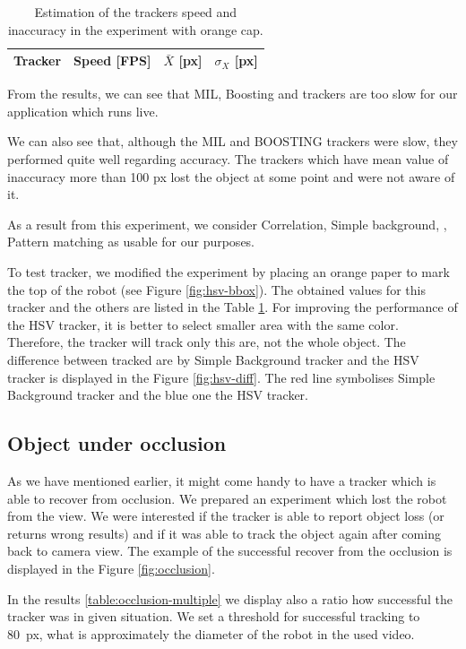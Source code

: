\begin{table}
\centering
\begin{tabular}{l|r|r|r}
Tracker	& Speed [FPS] & $\bar{X}$ [px] & $\sigma_X$ [px] \\
\hline

\end{tabular}
\caption{Estimation of the trackers speed and inaccuracy in the experiment with orange cap.}
\label{table:hsv}
\end{table}

From the results, we can see that MIL, Boosting and \tld{} trackers are too slow
for our application which runs live.

We can also see that, although the MIL and BOOSTING trackers were slow, they
performed quite well regarding accuracy. The trackers which have mean value of
inaccuracy more than 100 px lost the object at some point and were not aware of
it.

As a result from this experiment, we consider Correlation, Simple background,
\medflow{}, Pattern matching as usable for our purposes.

To test \hsv{} tracker, we modified the experiment by placing an orange paper to
mark the top of the robot (see Figure \ref{fig:hsv-bbox}). The obtained
values for this tracker and the others are listed in the Table \ref{table:hsv}.
For improving the performance of the HSV tracker, it is better to select
smaller area with the same color. Therefore, the tracker will track only this
are, not the whole object. The difference between tracked are by Simple
Background tracker and the HSV tracker is displayed in the Figure
\ref{fig:hsv-diff}. The red line symbolises Simple Background tracker and the
blue one the HSV tracker.

\subsection{Object under occlusion}

As we have mentioned earlier, it might come handy to have a tracker which is
able to recover from occlusion. We prepared an experiment which lost the
robot from the view. We were interested if the tracker is able to report object
loss (or returns wrong results) and if it was able to track the object again
after coming back to camera view. The example of the successful recover from
the occlusion is displayed in the Figure \ref{fig:occlusion}.

In the results \ref{table:occlusion-multiple} we display also a ratio how
successful the tracker was in given situation. We set a threshold for
successful tracking to 80~px, what is approximately the diameter of the robot
in the used video.


